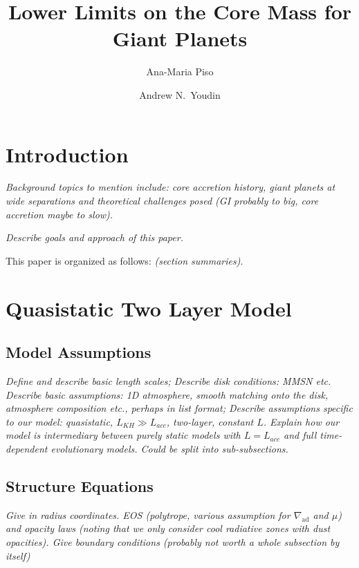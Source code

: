 \documentclass[apj]{emulateapj}
\newcommand{\emgr}[1]{\emph{ \color{gray} #1}}
\begin{document}



\title{Lower Limits on the Core Mass for Giant Planets}
\author{Ana-Maria Piso}
\author{ Andrew N.\ Youdin}

\section{Introduction}
\emgr{Background topics to mention include: core accretion history, giant planets at wide separations and theoretical challenges posed (GI probably to big, core accretion maybe to slow).}

\emgr{Describe goals and approach of this paper.}

This paper is organized as follows: \emgr{(section summaries)}.


\section{Quasistatic Two Layer Model}\label{sec:model}

\subsection{Model Assumptions}
\emgr{ Define and describe basic length scales; Describe disk conditions: MMSN etc. Describe basic assumptions: 1D atmosphere, smooth matching onto the disk, atmosphere composition etc., perhaps in list format; Describe assumptions specific to our model: quasistatic, $L_{KH} \gg L_{acc}$, two-layer, constant $L$. Explain how our model is intermediary between purely static models with $L=L_{acc}$ and full time-dependent evolutionary models. Could be split into sub-subsections.}

\subsection{Structure Equations}
\emgr{Give in radius coordinates. EOS (polytrope, various assumption for $\nabla_{\mathrm{ad}}$ and $\mu$) and opacity laws (noting that we only consider cool radiative zones with dust opacities). Give boundary conditions (probably not worth a whole subsection by itself)}
\end{document}

